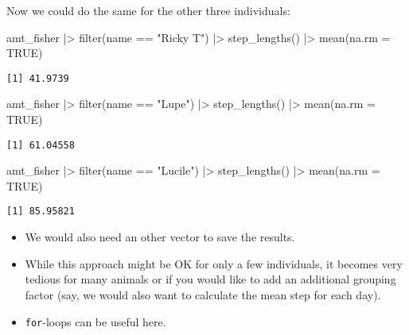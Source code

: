 \documentclass[ignorenonframetext,,t]{beamer}
\newenvironment{Shaded}{\begin{snugshade}}{\end{snugshade}}
\newcommand{\AttributeTok}[1]{\textcolor[rgb]{0.77,0.63,0.00}{#1}}
\newcommand{\ConstantTok}[1]{\textcolor[rgb]{0.00,0.00,0.00}{#1}}
\newcommand{\FunctionTok}[1]{\textcolor[rgb]{0.00,0.00,0.00}{#1}}
\newcommand{\NormalTok}[1]{#1}
\newcommand{\SpecialCharTok}[1]{\textcolor[rgb]{0.00,0.00,0.00}{#1}}
\newcommand{\StringTok}[1]{\textcolor[rgb]{0.31,0.60,0.02}{#1}}
\begin{document}
\begin{frame}[fragile]
Now we could do the same for the other three individuals:

\begin{Shaded}
\begin{Highlighting}[]
\NormalTok{amt\_fisher }\SpecialCharTok{|\textgreater{}} \FunctionTok{filter}\NormalTok{(name }\SpecialCharTok{==} \StringTok{"Ricky T"}\NormalTok{) }\SpecialCharTok{|\textgreater{}} 
  \FunctionTok{step\_lengths}\NormalTok{() }\SpecialCharTok{|\textgreater{}} \FunctionTok{mean}\NormalTok{(}\AttributeTok{na.rm =} \ConstantTok{TRUE}\NormalTok{)}
\end{Highlighting}
\end{Shaded}

\begin{verbatim}
[1] 41.9739
\end{verbatim}

\begin{Shaded}
\begin{Highlighting}[]
\NormalTok{amt\_fisher }\SpecialCharTok{|\textgreater{}} \FunctionTok{filter}\NormalTok{(name }\SpecialCharTok{==} \StringTok{"Lupe"}\NormalTok{) }\SpecialCharTok{|\textgreater{}} 
  \FunctionTok{step\_lengths}\NormalTok{() }\SpecialCharTok{|\textgreater{}} \FunctionTok{mean}\NormalTok{(}\AttributeTok{na.rm =} \ConstantTok{TRUE}\NormalTok{)}
\end{Highlighting}
\end{Shaded}

\begin{verbatim}
[1] 61.04558
\end{verbatim}

\begin{Shaded}
\begin{Highlighting}[]
\NormalTok{amt\_fisher }\SpecialCharTok{|\textgreater{}} \FunctionTok{filter}\NormalTok{(name }\SpecialCharTok{==} \StringTok{"Lucile"}\NormalTok{) }\SpecialCharTok{|\textgreater{}} 
  \FunctionTok{step\_lengths}\NormalTok{() }\SpecialCharTok{|\textgreater{}} \FunctionTok{mean}\NormalTok{(}\AttributeTok{na.rm =} \ConstantTok{TRUE}\NormalTok{)}
\end{Highlighting}
\end{Shaded}

\begin{verbatim}
[1] 85.95821
\end{verbatim}
\end{frame}

\begin{frame}[fragile]
\begin{itemize}
\item
  We would also need an other vector to save the results.
\item
  While this approach might be OK for only a few individuals, it becomes
  very tedious for many animals or if you would like to add an
  additional grouping factor (say, we would also want to calculate the
  mean step for each day).
\item
  \texttt{for}-loops can be useful here.
\end{itemize}
\end{frame}
\end{document}
